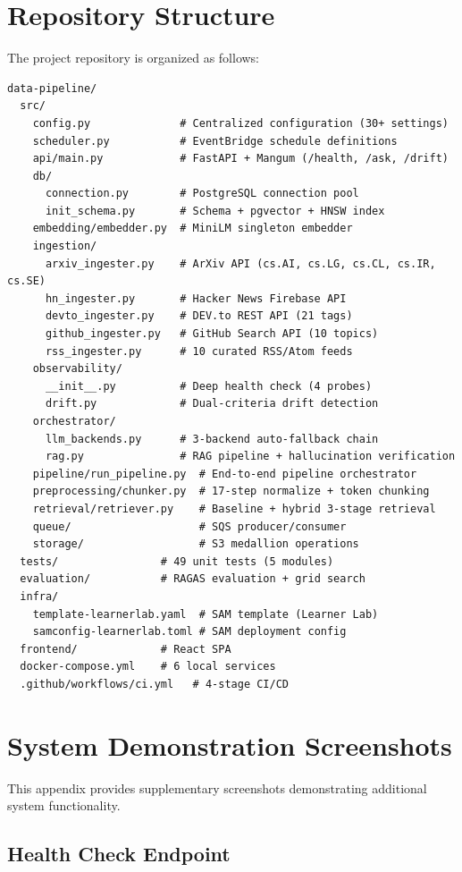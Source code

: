 \documentclass[12pt,a4paper]{report}
\begin{document}
\chapter{Repository Structure}

The project repository is organized as follows:

\begin{lstlisting}
data-pipeline/
  src/
    config.py              # Centralized configuration (30+ settings)
    scheduler.py           # EventBridge schedule definitions
    api/main.py            # FastAPI + Mangum (/health, /ask, /drift)
    db/
      connection.py        # PostgreSQL connection pool
      init_schema.py       # Schema + pgvector + HNSW index
    embedding/embedder.py  # MiniLM singleton embedder
    ingestion/
      arxiv_ingester.py    # ArXiv API (cs.AI, cs.LG, cs.CL, cs.IR, cs.SE)
      hn_ingester.py       # Hacker News Firebase API
      devto_ingester.py    # DEV.to REST API (21 tags)
      github_ingester.py   # GitHub Search API (10 topics)
      rss_ingester.py      # 10 curated RSS/Atom feeds
    observability/
      __init__.py          # Deep health check (4 probes)
      drift.py             # Dual-criteria drift detection
    orchestrator/
      llm_backends.py      # 3-backend auto-fallback chain
      rag.py               # RAG pipeline + hallucination verification
    pipeline/run_pipeline.py  # End-to-end pipeline orchestrator
    preprocessing/chunker.py  # 17-step normalize + token chunking
    retrieval/retriever.py    # Baseline + hybrid 3-stage retrieval
    queue/                    # SQS producer/consumer
    storage/                  # S3 medallion operations
  tests/                # 49 unit tests (5 modules)
  evaluation/           # RAGAS evaluation + grid search
  infra/
    template-learnerlab.yaml  # SAM template (Learner Lab)
    samconfig-learnerlab.toml # SAM deployment config
  frontend/             # React SPA
  docker-compose.yml    # 6 local services
  .github/workflows/ci.yml   # 4-stage CI/CD
\end{lstlisting}

\chapter{System Demonstration Screenshots}
\label{app:screenshots}

This appendix provides supplementary screenshots demonstrating additional system functionality.

\section*{Health Check Endpoint}
\end{document}
